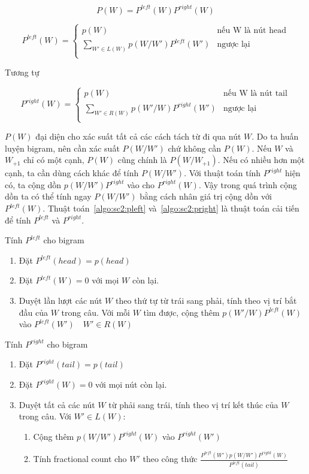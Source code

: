 \documentclass[a4paper,oneside,14pt]{extbook} %
\begin{document}
$$P(W)=P^{left}(W)P^{right}(W)$$

$$
P^{left}(W) = \left\{
    \begin{array}{ll}
      p(W)&\text{nếu W là nút head}\\
      \displaystyle\sum_{W' \in L(W)}p(W/W')P^{left}(W')&\text{ngược lại}\\
    \end{array}
  \right.
$$

Tương tự

$$
P^{right}(W) = \left\{
    \begin{array}{ll}
      p(W)&\text{nếu W là nút tail}\\
      \displaystyle\sum_{W' \in R(W)}p(W'/W)P^{right}(W')&\text{ngược lại}\\
    \end{array}
  \right.
$$

$P(W)$ đại diện cho xác suất tất cả các cách tách từ đi qua nút
$W$. Do ta huấn luyện bigram, nên cần xác suất $P(W/W')$ chứ không cần
$P(W)$. Nếu $W$ và $W_{+1}$ chỉ có một cạnh, $P(W)$ cũng chính là
$P(W/W_{+1})$. Nếu có nhiều hơn một cạnh, ta cần dùng cách khác để
tính $P(W/W')$. Với thuật toán tính $P^{right}$ hiện có, ta cộng dồn
$p(W/W')P^{right}$ vào cho $P^{right}(W)$. Vậy trong quá trình cộng
dồn ta có thể tính ngay $P(W/W')$ bằng cách nhân giá trị cộng dồn với
$P^{left}(W)$. Thuật toán~\ref{algo:sc2:pleft}
và~\ref{algo:sc2:pright} là thuật toán cải tiến để tính  $P^{left}$ và
$P^{right}$.

\begin{algo}\caption{Tính $P^{left}$ cho bigram}
\label{algo:sc2:pleft}
\begin{enumerate}
\item Đặt $P^{left}(head) = p(head)$
\item Đặt $P^{left}(W) = 0$ với mọi $W$ còn lại.
\item Duyệt lần lượt các nút $W$ theo thứ tự từ trái sang phải, tính
  theo vị trí bắt đầu của $W$ trong câu.
  Với mỗi $W$ tìm được, cộng thêm $p(W'/W)P^{left}(W)$ vào $P^{left}(W')\quad
  W' \in R(W)$
\end{enumerate}
\end{algo}

\begin{algo}\caption{Tính $P^{right}$ cho bigram}
\label{algo:sc2:pright}
\begin{enumerate}
\item Đặt $P^{right}(tail) = p(tail)$
\item Đặt $P^{right}(W) = 0$ với mọi nút còn lại.
\item Duyệt tất cả các nút $W$ từ phải sang trái, tính theo vị trí kết
  thúc của $W$ trong câu. Với $W' \in L(W)$:
  \begin{enumerate}
  \item Cộng thêm $p(W/W')P^{right}(W)$ vào $P^{right}(W')$
  \item Tính fractional count cho $W'$ theo công thức
    $\displaystyle\frac{P^{left}(W')p(W/W')P^{right}(W)}{P^{left}(tail)}$
  \end{enumerate}
\end{enumerate}
\end{algo}
\end{document}
